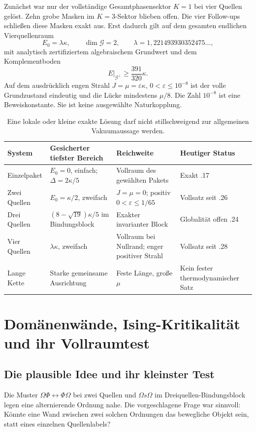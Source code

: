 Zunächst war nur der vollständige Gesamtphasensektor $K=1$ bei vier Quellen gelöst. Zehn grobe Masken im $K=3$-Sektor blieben offen. Die vier Follow-ups schließen diese Masken exakt aus. Erst dadurch gilt auf dem gesamten endlichen Vierquellenraum
\[
 E_0=\lambda\kappa,\qquad\dim\mathcal G=2,\qquad
 \lambda=1{,}221493930352475\ldots,
\]
mit analytisch zertifiziertem algebraischem Grundwert und dem Komplementboden
\[
 E\big|_{\mathcal G^\perp}\ge\frac{391}{320}\kappa.
\]
Auf dem ausdrücklich engen Strahl $J=\mu=\varepsilon\kappa$, $0<\varepsilon\le10^{-8}$ ist der volle Grundzustand eindeutig und die Lücke mindestens $\mu/8$. Die Zahl $10^{-8}$ ist eine Beweiskonstante. Sie ist keine ausgewählte Naturkopplung. 

\begin{table}[ht]
\centering\small
\begin{tabularx}{\textwidth}{@{}lYYY@{}}
\toprule
System & Gesicherter tiefster Bereich & Reichweite & Heutiger Status\\\midrule
Einzelpaket & $E_0=0$, einfach; $\Delta=2\kappa/5$ & Vollraum des gewählten Pakets & Exakt .17\\
Zwei Quellen & $E_0=\kappa/2$, zweifach & $J=\mu=0$; positiv $0<\varepsilon\le1/65$ & Vollsatz seit .26\\
Drei Quellen & $(8-\sqrt{19})\kappa/5$ im Bindungsblock & Exakter invarianter Block & Globalität offen .24\\
Vier Quellen & $\lambda\kappa$, zweifach & Vollraum bei Nullrand; enger positiver Strahl & Vollsatz seit .28\\
Lange Kette & Starke gemeinsame Ausrichtung & Feste Länge, große $\mu$ & Kein fester thermodynamischer Satz\\\bottomrule
\end{tabularx}
\caption{Eine lokale oder kleine exakte Lösung darf nicht stillschweigend zur allgemeinen Vakuumaussage werden.}
\end{table}

\chapter{Domänenwände, Ising-Kritikalität und ihr Vollraumtest}
\section{Die plausible Idee und ihr kleinster Test}
Die Muster $\Omega\Phi\leftrightarrow\Phi\Omega$ bei zwei Quellen und $\Omega s\Omega$ im Dreiquellen-Bindungsblock legen eine alternierende Ordnung nahe. Die vorgeschlagene Frage war sinnvoll: Könnte eine Wand zwischen zwei solchen Ordnungen das bewegliche Objekt sein, statt eines einzelnen Quellenlabels?

